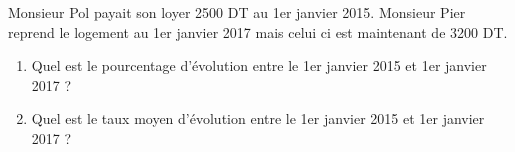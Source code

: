 
Monsieur Pol payait son loyer 2500 DT au 1er janvier 2015. Monsieur Pier reprend le logement au 1er janvier 2017 mais celui ci est maintenant de 3200 DT.

\begin{enumerate}
\item Quel est le pourcentage d'évolution entre le 1er janvier 2015 et 1er janvier 2017 ? 
\item Quel est le taux moyen d'évolution entre le 1er janvier 2015 et 1er janvier 2017 ?
\end{enumerate}